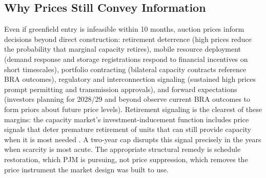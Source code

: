 \subsection{Why Prices Still Convey Information}
\label{subsec:lt_channels}

Even if greenfield entry is infeasible within 10 months, auction prices
inform decisions beyond direct construction: retirement deterrence (high
prices reduce the probability that marginal capacity retires), mobile
resource deployment (demand response and storage registrations respond to
financial incentives on short timescales), portfolio contracting (bilateral
capacity contracts reference BRA outcomes), regulatory and interconnection
signaling (sustained high prices prompt permitting and transmission approvals),
and forward expectations (investors planning for 2028/29 and beyond observe
current BRA outcomes to form priors about future price levels).
Retirement signaling is the clearest of these margins: the capacity market's
investment-inducement function includes price signals that deter premature
retirement of units that can still provide capacity when it is most needed
\citep{Cramton2005_capacity}. A two-year cap disrupts this signal precisely
in the years when scarcity is most acute.
The appropriate structural remedy is schedule restoration, which PJM is
pursuing, not price suppression, which removes the price instrument the
market design was built to use.
